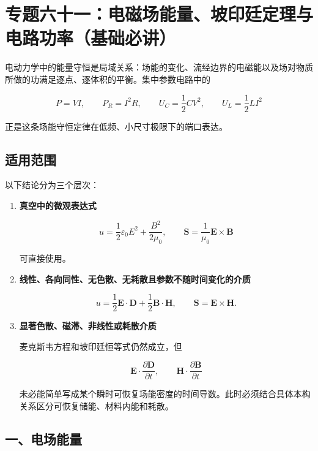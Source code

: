 \section{专题六十一：电磁场能量、坡印廷定理与电路功率（基础必讲）}\label{m7:ux4e13ux9898ux516dux5341ux4e00ux7535ux78c1ux573aux80fdux91cfux5761ux5370ux5ef7ux5b9aux7406ux4e0eux7535ux8defux529fux7387ux57faux7840ux5fc5ux8bb2}

电动力学中的能量守恒是局域关系：场能的变化、流经边界的电磁能以及场对物质所做的功满足逐点、逐体积的平衡。集中参数电路中的

\[
P=VI,\qquad
P_R=I^2R,\qquad
U_C=\frac12CV^2,\qquad
U_L=\frac12LI^2
\]

正是这条场能守恒定律在低频、小尺寸极限下的端口表达。

\subsection{适用范围}\label{m7:ux9002ux7528ux8303ux56f4}

以下结论分为三个层次：

\begin{enumerate}
\def\labelenumi{\arabic{enumi}.}
\item
  \textbf{真空中的微观表达式}

  \[
  u=\frac12\varepsilon_0E^2+\frac{B^2}{2\mu_0},
  \qquad
  \mathbf S=\frac1{\mu_0}\mathbf E\times\mathbf B
  \]

  可直接使用。
\item
  \textbf{线性、各向同性、无色散、无耗散且参数不随时间变化的介质}

  \[
  u=\frac12\mathbf E\cdot\mathbf D
  +\frac12\mathbf B\cdot\mathbf H,
  \qquad
  \mathbf S=\mathbf E\times\mathbf H.
  \]
\item
  \textbf{显著色散、磁滞、非线性或耗散介质}

  麦克斯韦方程和坡印廷恒等式仍然成立，但

  \[
  \mathbf E\cdot\frac{\partial\mathbf D}{\partial t},
  \qquad
  \mathbf H\cdot\frac{\partial\mathbf B}{\partial t}
  \]

  未必能简单写成某个瞬时可恢复场能密度的时间导数。此时必须结合具体本构关系区分可恢复储能、材料内能和耗散。
\end{enumerate}

\subsection{一、电场能量}\label{m7:ux4e00ux7535ux573aux80fdux91cf}

